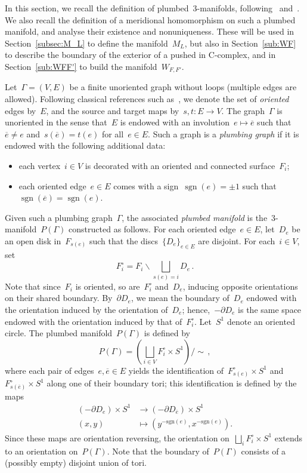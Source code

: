 \documentclass[10.9pt,a4paper]{amsart}
\theoremstyle{definition}
\theoremstyle{remark}
\newcommand{\sgn}{\operatorname{sgn}}
\begin{document}
In this section, we recall the definition of plumbed~$3$-manifolds, following~\cite[Section~4.5]{ConwayNagelToffoli} and~\cite[Section~2.5]{CMP}.
We also recall the definition of a meridional homomorphism on such a plumbed manifold, and analyse their existence and nonuniqueness.
These will be used in Section~\ref{subsec:M_L} to define the manifold~$M_L$, but also in Section~\ref{sub:WF} to describe the boundary of the exterior of a pushed in C-complex, and in Section~\ref{sub:WFF'} to build the manifold~$W_{F,F'}$.

\medskip

Let~$\Gamma=(V,E)$ be a finite unoriented graph without loops (multiple edges are allowed). Following classical references such as~\cite{Serre}, we denote
the set of {\em oriented\/} edges by~$E$, and the source and target maps by~$s,t\colon E\to V$. The graph~$\Gamma$ is unoriented in the sense that~$E$ is endowed with an involution~$e\mapsto \overline{e}$ such that~$\overline{e}\neq e$ and~$s(\overline{e})=t(e)$ for all~$e\in E$. Such a graph is a \emph{plumbing graph} if it is endowed with the following additional data: 
\begin{itemize}
\item each vertex~$i \in V$ is decorated with an oriented and connected surface~$F_i$;
\item each oriented edge~$e \in E$ comes with a sign~$\sgn(e)=\pm 1$ such that~$\sgn(\overline{e})=\sgn(e)$.
\end{itemize}

Given such a plumbing graph~$\Gamma$, the associated \emph{plumbed manifold} is the~$3$-manifold~$P(\Gamma)$
constructed as follows.
For each oriented edge~$e \in E$, let~$D_e$ be an open disk in~$F_{s(e)}$ such that the discs~$\{D_e\}_{e\in E}$ are disjoint. For each~$i\in V$, set
\[
F_i^\circ =  F_i\backslash \bigsqcup_{s(e)=i} D_e\,.
\]
Note that since~$F_i$ is oriented, so are~$F_i^\circ$ and~$D_e$, inducing opposite orientations on their shared boundary. By~$\partial D_e$, we mean the boundary of~$D_e$ endowed with the orientation induced by the orientation
of~$D_e$; hence,~$-\partial D_e$ is the same space endowed with the orientation induced by that of~$F_i^\circ$. Let~$S^1$ denote an oriented circle. The plumbed manifold~$P(\Gamma)$ is defined by
\[
P(\Gamma) = \left(\bigsqcup_{i\in V} F_i^\circ \times S^1\right) \slash \sim\,,
\]
where each pair of edges~$e,\overline{e}\in E$ yields the identification of~$F_{s(e)}^\circ\times S^1$ and~$F_{s(\overline{e})}^\circ\times S^1$ along one of their boundary tori; this identification is defined by
the maps
\begin{equation}
\label{eq:ident}
\begin{aligned}
(-\partial D_e)\times S^1 & \longrightarrow (-\partial D_{\overline{e}})\times S^1\\
( x, y )& \longmapsto (y^{-\textrm{sgn}(e)}, x^{-\textrm{sgn}(e)}).
\end{aligned}
\end{equation}
Since these maps are orientation reversing, the orientation on~$\bigsqcup_i F_i^\circ \times S^1$ extends to
an orientation on~$P(\Gamma)$.
Note that the boundary of~$P(\Gamma)$ consists of a (possibly empty) disjoint union of tori.
\end{document}
